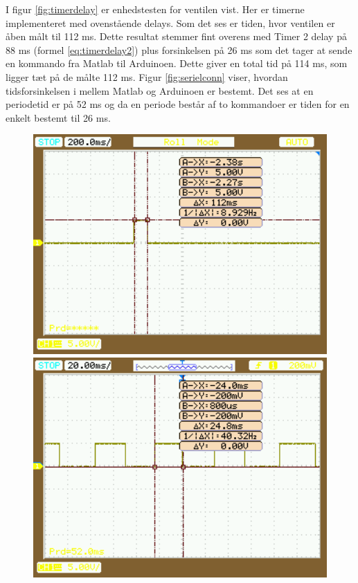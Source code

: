 I figur \ref{fig:timerdelay} er enhedstesten for ventilen vist. Her er timerne implementeret med ovenstående delays. Som det ses er tiden, hvor ventilen er åben målt til 112 ms. Dette resultat stemmer fint overens med Timer 2 delay på 88 ms (formel \ref{eq:timerdelay2}) plus forsinkelsen på 26 ms som det tager at sende en kommando fra Matlab til Arduinoen. Dette giver en total tid på 114 ms, som ligger tæt på de målte 112 ms. Figur \ref{fig:serielconn} viser, hvordan tidsforsinkelsen i mellem Matlab og Arduinoen er bestemt. Det ses at en periodetid er på 52 ms og da en periode består af to kommandoer er tiden for en enkelt bestemt til 26 ms.

 \begin{figure}[H] \centering
\begin{minipage}[b]{0.48\textwidth} \centering
\includegraphics[width=1.00\textwidth]{billeder/timerdelay.png} %
\end{minipage} \hfill
\begin{minipage}[b]{0.48\textwidth} \centering
\includegraphics[width=1.00\textwidth]{billeder/serialconn.png} %

\end{minipage}
\end{figure}

